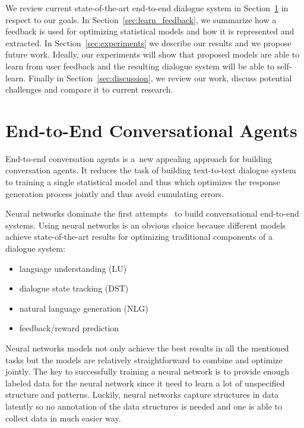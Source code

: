 \documentclass[11pt]{article}
\begin{document}
We review current state-of-the-art end-to-end dialogue system in Section~\ref{sec:e2end} in respect to our goals.
In Section~\ref{sec:learn_feedback}, we summarize how a feedback is used for optimizing statistical models and how it is represented and extracted. 
In Section~\ref{sec:experiments} we describe our results and we propose future work. 
Ideally, our experiments will show that proposed models are able to learn from user feedback and the resulting dialogue system will be able to self-learn.
Finally in Section~\ref{sec:discussion}, we review our work, discuss potential challenges and compare it to current research.


\section{End-to-End Conversational Agents}
\label{sec:e2end}
End-to-end conversation agents is a~new appealing approach for building conversation agents.
It reduces the task of building text-to-text dialogue system to training a single statistical model and thus which optimizes the response generation process jointly and thus avoid cumulating errors.

Neural networks dominate the first attempts~\cite{williams2016end,bordes_learning_2016,weston2015endtoend_prereq} to build conversational end-to-end systems.
Using neural networks is an obvious choice because different models achieve state-of-the-art results for optimizing traditional components of a dialogue system:
\begin{itemize}
    \item language understanding (LU) \cite{mairesse_spoken_2009} 
    \item dialogue state tracking (DST) \cite{williams_web-style_2014,henderson2014word,vodolan_hybrid_2015,platek_recurrent_2016}
    \item natural language generation (NLG) \cite{dusek_sequence2sequence_2016,wen_networkbased_2016}
    \item feedback/reward prediction~\cite{su_learning_2015}
\end{itemize}
Neural networks models not only achieve the best results in all the mentioned tasks but the models are relatively straightforward to combine and optimize jointly.
The key to successfully training a neural network is to provide enough labeled data for the neural network since it need to learn a lot of unspecified structure and patterns.
Luckily, neural networks capture structures in data latently so no annotation of the data structures is needed and one is able to collect data in much easier way.
\end{document}
